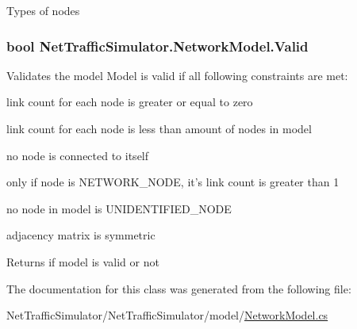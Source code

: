 Types of nodes \hypertarget{classNetTrafficSimulator_1_1NetworkModel_a58af85d9a9121926149ef5e2ce332e76}{
\subsubsection[{Valid}]{\setlength{\rightskip}{0pt plus 5cm}bool Net\-Traffic\-Simulator.\-Network\-Model.\-Valid\hspace{0.3cm}{\ttfamily [get]}}}\label{classNetTrafficSimulator_1_1NetworkModel_a58af85d9a9121926149ef5e2ce332e76}
Validates the model Model is valid if all following constraints are met\-:
\begin{DoxyItemize}
\item link count for each node is greater or equal to zero
\item link count for each node is less than amount of nodes in model
\item no node is connected to itself
\item only if node is N\-E\-T\-W\-O\-R\-K\-\_\-\-N\-O\-D\-E, it's link count is greater than 1
\item no node in model is U\-N\-I\-D\-E\-N\-T\-I\-F\-I\-E\-D\-\_\-\-N\-O\-D\-E
\item adjacency matrix is symmetric \begin{DoxyReturn}{Returns}
if model is valid or not 
\end{DoxyReturn}

\end{DoxyItemize}

The documentation for this class was generated from the following file\-:\begin{DoxyCompactItemize}
\item 
Net\-Traffic\-Simulator/\-Net\-Traffic\-Simulator/model/\hyperlink{NetworkModel_8cs}{Network\-Model.\-cs}\end{DoxyCompactItemize}
